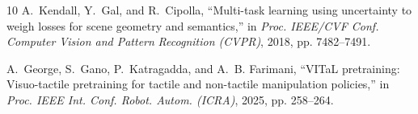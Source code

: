 \documentclass[letterpaper,10pt,conference]{ieeeconf}
\begin{document}
\begin{thebibliography}{10}
A.~Kendall, Y.~Gal, and R.~Cipolla, ``Multi-task learning using uncertainty to
  weigh losses for scene geometry and semantics,'' in \emph{Proc. IEEE/CVF
  Conf. Computer Vision and Pattern} \emph{Recognition (CVPR)}, 2018, pp. 7482--7491.

A.~George, S.~Gano, P.~Katragadda, and A.~B. Farimani, ``{VITaL} pretraining:
Visuo-tactile pretraining for tactile and non-tactile manipulation policies,''
in \emph{Proc. IEEE Int. Conf. Robot. Autom. (ICRA)}, 2025, pp. 258--264.

\end{thebibliography}
\end{document}

